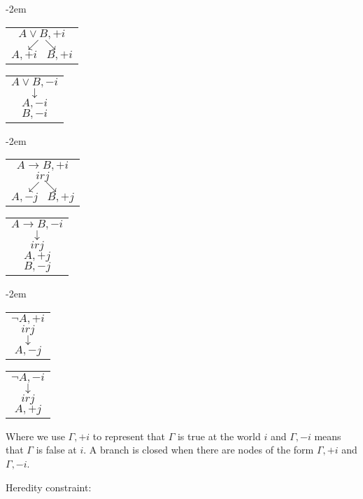 \documentclass[12pt,a4paper]{article}
\theoremstyle{definition}
\begin{document}
\kern-2em %

\begin{minipage}{0.4\textwidth}
\begin{tabular}{p{\textwidth}}
\[ A \lor B, +i \]
\[ \swarrow \searrow \]
\[ A, +i \hspace{10pt} B, +i \]
\end{tabular}
\end{minipage}
\hfill
\begin{minipage}{0.4\textwidth}
\begin{tabular}{p{\textwidth}}
\[ A \lor B,-i \]
\[ \downarrow \]
\[ A, -i \]
\[ B,-i \]
\end{tabular}
\end{minipage}

\kern-2em %

\begin{minipage}{0.4\textwidth}
\begin{tabular}{p{\textwidth}}
\[ A \to B, +i \]
\[ irj \]
\[ \swarrow \searrow \]
\[ A, -j \hspace{10pt} B, +j \]
\end{tabular}
\end{minipage}
\hfill
\begin{minipage}{0.4\textwidth}
\begin{tabular}{p{\textwidth}}
\[ A \to B,-i \]
\[ \downarrow \]
\[ irj \]
\[ A, +j \]
\[ B, -j \]
\end{tabular}
\end{minipage}

\kern-2em %

\begin{minipage}{0.4\textwidth}
\begin{tabular}{p{\textwidth}}
\[ \neg A, +i \]
\[ irj \]
\[ \downarrow \]
\[ A, -j \]
\end{tabular}
\end{minipage}
\hfill
\begin{minipage}{0.4\textwidth}
\begin{tabular}{p{\textwidth}}
\[ \neg A,-i \]
\[ \downarrow \]
\[ irj \]
\[ A, +j \]
\end{tabular}
\end{minipage}

Where we use $\Gamma,+i$ to represent that $\Gamma$ is true at the world $i$ and $\Gamma,-i$ means that $\Gamma$ is false at $i$. A branch is closed when there are nodes of the form $\Gamma,+i$ and $\Gamma,-i$.

Heredity constraint:
\end{document}
